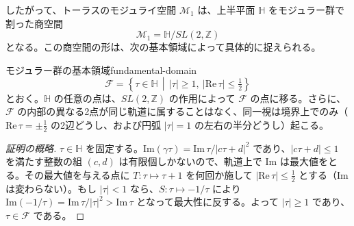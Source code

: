 \documentclass[uplatex, dvipdfmx, book]{jsbook}
\begin{document}
したがって、トーラスのモジュライ空間 $\mathcal{M}_{1}$ は、上半平面 $\mathbb{H}$ をモジュラー群で割った商空間
\begin{equation}
    \mathcal{M}_{1} = \mathbb{H} / SL(2, \mathbb{Z})
\end{equation}
となる。この商空間の形は、次の基本領域によって具体的に捉えられる。

\begin{myprop}{モジュラー群の基本領域}{fundamental-domain}
\begin{equation*}
    \mathcal{F} = \left\{ \tau \in \mathbb{H} \,\middle|\, |\tau| \ge 1,\ |\mathrm{Re}\,\tau| \le \tfrac{1}{2} \right\}
\end{equation*}
とおく。$\mathbb{H}$ の任意の点は、$SL(2, \mathbb{Z})$ の作用によって $\mathcal{F}$ の点に移る。さらに、$\mathcal{F}$ の内部の異なる2点が同じ軌道に属することはなく、同一視は境界上でのみ（$\mathrm{Re}\,\tau = \pm\frac12$ の2辺どうし、および円弧 $|\tau| = 1$ の左右の半分どうし）起こる。
\end{myprop}

\begin{proof}[証明の概略]
$\tau \in \mathbb{H}$ を固定する。$\mathrm{Im}(\gamma\tau) = \mathrm{Im}\,\tau / |c\tau + d|^2$ であり、$|c\tau + d| \le 1$ を満たす整数の組 $(c, d)$ は有限個しかないので、軌道上で $\mathrm{Im}$ は最大値をとる。その最大値を与える点に $T: \tau \mapsto \tau + 1$ を何回か施して $|\mathrm{Re}\,\tau| \le \frac12$ とする（$\mathrm{Im}$ は変わらない）。もし $|\tau| < 1$ なら、$S: \tau \mapsto -1/\tau$ により $\mathrm{Im}(-1/\tau) = \mathrm{Im}\,\tau/|\tau|^2 > \mathrm{Im}\,\tau$ となって最大性に反する。よって $|\tau| \ge 1$ であり、$\tau \in \mathcal{F}$ である。
\end{proof}
\end{document}
